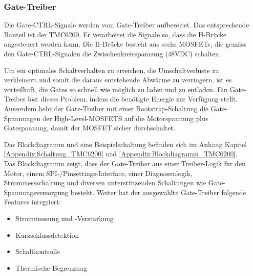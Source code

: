 \subsubsection{Gate-Treiber}
\label{subsubsec:Gate-Treiber}


Die Gate-CTRL-Signale werden vom Gate-Treiber aufbereitet. Das entsprechende Bauteil ist der TMC6200. Er verarbeitet die Signale so, dass die H-Brücke angesteuert werden kann. Die H-Brücke besteht aus sechs MOSFETs, die gemäss den Gate-CTRL-Signalen die Zwischenkreisspannung (48VDC) schalten.

Um ein optimales Schaltverhalten zu erreichen, die Umschaltverluste zu verkleinern und somit die daraus entstehende Abwärme zu verringern, ist es vorteilhaft, die Gates so schnell wie möglich zu laden und zu entladen. Ein Gate-Treiber löst dieses Problem, indem die benötigte Energie zur Verfügung stellt. Ausserdem hebt der Gate-Treiber mit einer Bootstrap-Schaltung die Gate-Spannungen der High-Level-MOSFETS auf die Motorspannung plus Gatespannung, damit der MOSFET sicher durchschaltet.

Das Blockdiagramm und eine Beispielschaltung befinden sich im Anhang Kapitel \ref{Appendix:Schaltung_TMC6200} und \ref{Appendix:Blockdiagramm_TMC6200}. Das Blockdiagramm zeigt, dass der Gate-Treiber aus einer Treiber-Logik für den Motor, einem SPI-/Pinsettings-Interface, einer Diagnosenlogik, Strommessschaltung und diversen unterstützenden Schaltungen wie Gate-Spannungsversorgung besteht. Weiter hat der ausgewählte Gate-Treiber folgende Features integriert:
\begin{itemize}
\item Strommessung und -Verstärkung
\item Kurzschlussdetektion
\item Schaltkontrolle
\item Thermische Begrenzung
\end{itemize}

